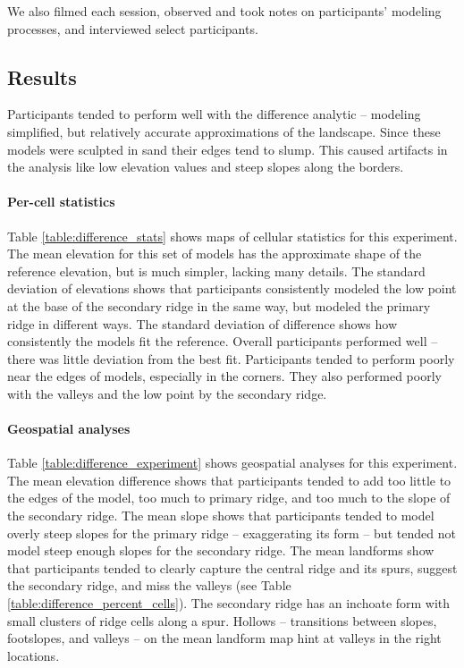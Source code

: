 \documentclass[prodmode,acmtochi]{acmsmall} %
\begin{document}
We also filmed each session, 
observed and took notes on participants' modeling processes, 
and interviewed select participants.
% 

\subsection{Results}
Participants tended to perform well with the difference analytic 
-- modeling simplified, but relatively accurate approximations of the landscape.
Since these models were sculpted in sand
their edges tend to slump.
This caused artifacts in the analysis like
low elevation values and steep slopes
along the borders. 

\paragraph{Per-cell statistics}
Table \ref{table:difference_stats} shows maps of cellular statistics for this experiment.
The mean elevation for this set of models
has the approximate shape of the reference elevation, 
but is much simpler, lacking many details. 
The standard deviation of elevations shows that participants 
consistently modeled the low point at the base of the secondary ridge
in the same way, 
but modeled the primary ridge in different ways. 
The standard deviation of difference shows 
how consistently the models fit the reference. 
Overall participants performed well -- there was little deviation from the best fit. 
Participants tended to perform poorly near the edges of models, especially in the corners.
They also performed poorly with the valleys and the low point by the secondary ridge.

\paragraph{Geospatial analyses}
Table \ref{table:difference_experiment} shows geospatial analyses for this experiment.
%
The mean elevation difference shows that participants tended to add
too little to the edges of the model,
too much to primary ridge,
and too much to the slope of the secondary ridge. 
The mean slope shows that participants tended to model 
overly steep slopes for the primary ridge -- exaggerating its form --
but tended not model steep enough slopes for the secondary ridge. 
The mean landforms show that participants tended to 
clearly capture the central ridge and its spurs,
suggest the secondary ridge, 
and miss the valleys (see Table \ref{table:difference_percent_cells}). 
The secondary ridge has an inchoate form 
with small clusters of ridge cells along a spur.
Hollows -- transitions between slopes, footslopes, and valleys -- 
on the mean landform map hint at valleys in the right locations.
\end{document}
